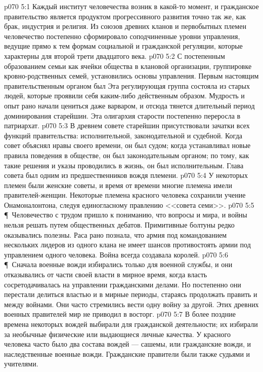 \vs p070 5:1 Каждый институт человечества возник в какой\hyp{}то момент, и гражданское правительство является продуктом прогрессивного развития точно так же, как брак, индустрия и религия. Из союзов древних кланов и первобытных племен человечество постепенно сформировало соподчиненные уровни управления, ведущие прямо к тем формам социальной и гражданской регуляции, которые характерны для второй трети двадцатого века.
\vs p070 5:2 С постепенным образованием семьи как ячейки общества в клановой организации, группировке кровно\hyp{}родственных семей, установились основы управления. Первым настоящим правительственным органом был  Эта регулирующая группа состояла из старых людей, которые проявили себя каким\hyp{}либо действенным образом. Мудрость и опыт рано начали цениться даже варваром, и отсюда тянется длительный период доминирования старейшин. Эта олигархия старости постепенно переросла в патриархат.
\vs p070 5:3 В древнем совете старейшин присутствовали зачатки всех функций правительства: исполнительной, законодательной и судебной. Когда совет объяснял нравы своего времени, он был судом; когда устанавливал новые правила поведения в обществе, он был законодательным органом; по тому, как такие решения и указы проводились в жизнь, он был исполнительным. Глава совета был одним из предшественников вождя племени.
\vs p070 5:4 У некоторых племен были женские советы, и время от времени многие племена имели правителей\hyp{}женщин. Некоторые племена красного человека сохранили учение Онамоналонтона, следуя единогласному правлению <<совета семи>>.
\vs p070 5:5 \P\ Человечество с трудом пришло к пониманию, что вопросы и мира, и войны нельзя решать путем общественных дебатов. Примитивные болтуны редко оказывались полезны. Раса рано познала, что армия под командованием нескольких лидеров из одного клана не имеет шансов противостоять армии под управлением одного человека. Война всегда создавала королей.
\vs p070 5:6 \P\ Сначала военные вожди избирались только для военной службы, и они отказывались от части своей власти в мирное время, когда власть сосретодачивалась на управлении гражданскими делами. Но постепенно они перестали делиться властью и в мирные периоды, стараясь продолжать править и между войнами. Они часто стремились вести одну войну за другой. Этих древних военных правителей мир не приводил в восторг.
\vs p070 5:7 В более поздние времена некоторых вождей выбирали для гражданской деятельности; их избирали за необычные физические или выдающиеся личные качества. У красного человека часто было два состава вождей --- сашемы, или гражданские вожди, и наследственные военные вожди. Гражданские правители были также судьями и учителями.
